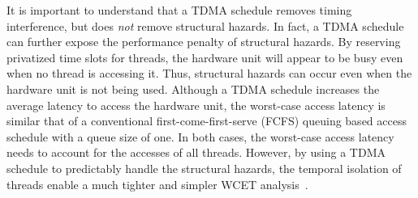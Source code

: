 It is important to understand that a TDMA schedule removes timing interference, but does \emph{not} remove structural hazards.
In fact, a TDMA schedule can further expose the performance penalty of structural hazards.
By reserving privatized time slots for threads, the hardware unit will appear to be busy even when no thread is accessing it.
Thus, structural hazards can occur even when the hardware unit is not being used.
Although a TDMA schedule increases the average latency to access the hardware unit, the worst-case access latency is similar that of a conventional first-come-first-serve (FCFS) queuing based access schedule with a queue size of one.
In both cases, the worst-case access latency needs to account for the accesses of all threads.      
However, by using a TDMA schedule to predictably handle the structural hazards, the temporal isolation of threads enable a much tighter and simpler WCET analysis~\cite{Lv:2010:CAI:1935940.1936246}.



